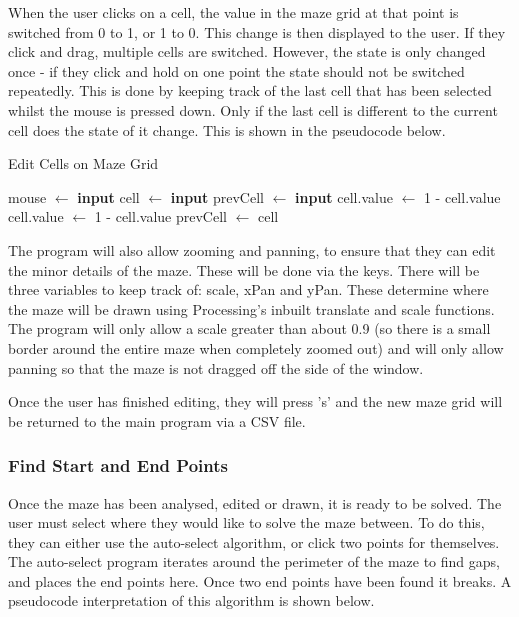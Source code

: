 \documentclass[titlepage]{article}
\begin{document}
When the user clicks on a cell, the value in the maze grid at that point is switched from 0 to 1, or 1 to 0. This change is then displayed to the user. If they click and drag, multiple cells are switched. However, the state is only changed once - if they click and hold on one point the state should not be switched repeatedly. This is done by keeping track of the last cell that has been selected whilst the mouse is pressed down. Only if the last cell is different to the current cell does the state of it change. This is shown in the pseudocode below.

\begin{algorithm}[H]
\caption{Edit Cells on Maze Grid}
\begin{algorithmic}[1]
	\State mouse $\gets$ \textbf{input}
	\State cell $\gets$ \textbf{input}
	\State prevCell $\gets$ \textbf{input}
		\State cell.value $\gets$ 1 - cell.value
		\State cell.value $\gets$ 1 - cell.value
		\State prevCell $\gets$ cell
	\EndIf
\end{algorithmic}
\end{algorithm}

The program will also allow zooming and panning, to ensure that they can edit the minor details of the maze. These will be done via the keys. There will be three variables to keep track of: scale, xPan and yPan. These determine where the maze will be drawn using Processing's inbuilt translate and scale functions. The program will only allow a scale greater than about 0.9 (so there is a small border around the entire maze when completely zoomed out) and will only allow panning so that the maze is not dragged off the side of the window. 

Once the user has finished editing, they will press 's' and the new maze grid will be returned to the main program via a CSV file.

\subsubsection{Find Start and End Points}

Once the maze has been analysed, edited or drawn, it is ready to be solved. The user must select where they would like to solve the maze between. To do this, they can either use the auto-select algorithm, or click two points for themselves. The auto-select program iterates around the perimeter of the maze to find gaps, and places the end points here. Once two end points have been found it breaks. A pseudocode interpretation of this algorithm is shown below. 
\end{document}
